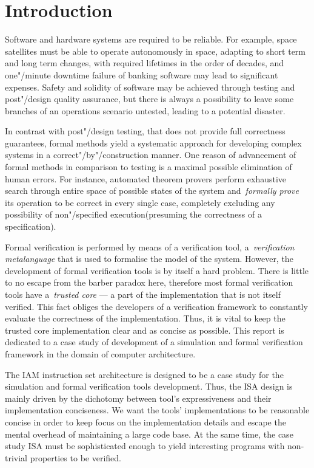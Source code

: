 \section{Introduction}

Software and hardware systems are required to be reliable.
For example, space satellites must be able to operate autonomously in space,
adapting to short term and long term changes,
with required lifetimes in the order of decades,
and one"/minute downtime failure of banking software may lead to significant expenses.
Safety and solidity of software may be achieved through testing and post"/design quality
assurance, but there is always a possibility to leave some branches of an operations
scenario untested, leading to a potential disaster.

In contrast with post"/design testing, that does not provide full
correctness guarantees, formal methods yield a systematic approach for developing
complex systems in a correct"/by"/construction manner. One reason of advancement of
formal methods in comparison to testing is a maximal possible elimination of human errors.
For instance, automated theorem provers perform exhaustive search
through entire space of possible states of the system and~\emph{formally prove} its
operation to be correct in every single case, completely excluding any possibility of
non"/specified execution(presuming the correctness of a specification).

Formal verification is performed by means of a verification tool,
a~\emph{verification metalanguage} that is used to formalise the model of the system.
However, the development of formal verification tools is by itself a hard problem.
There is little to no escape from the barber paradox here, therefore most formal
verification tools have a~\emph{trusted core} --- a part of the implementation that
is not itself verified. This fact obliges the developers of a verification framework
to constantly evaluate the correctness of the implementation. Thus, it is vital
to keep the trusted core implementation clear and as concise as possible. This report
is dedicated to a case study of development of a simulation and formal verification
framework in the domain of computer architecture.

The IAM instruction set architecture is designed to be a case study for
the simulation and formal verification tools development. Thus, the ISA design
is mainly driven by the dichotomy between tool's expressiveness and their
implementation conciseness.
We want the tools' implementations to be reasonable concise in order to keep
focus on the implementation details and escape the mental overhead of maintaining a large
code base. At the same time, the case study ISA must be sophisticated enough to
yield interesting programs with non-trivial properties to be verified.

